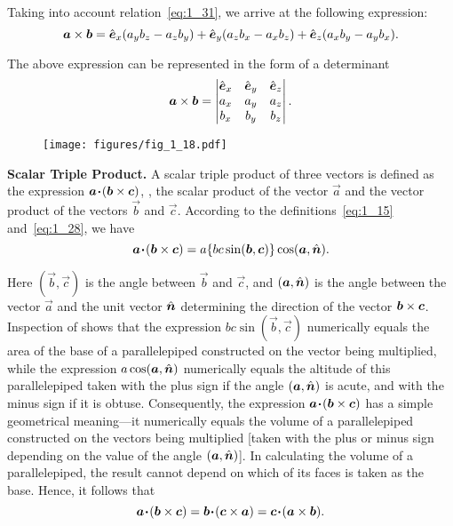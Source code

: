 \noindent
Taking into account relation~\eqref{eq:1_31}, we arrive at the following expression:
\begin{equation}\label{eq:1_32}
\boldsymbol{a}\times\boldsymbol{b} = \hat{\boldsymbol{e}}_{x}(a_yb_z - a_zb_y) + \hat{\boldsymbol{e}}_{y}(a_zb_x - a_xb_z) + \hat{\boldsymbol{e}}_{z}(a_xb_y - a_yb_x).
\end{equation}

\noindent
The above expression can be represented in the form of a determinant
\begin{equation}\label{eq:1_33}
\boldsymbol{a}\times\boldsymbol{b} = \begin{vmatrix}
\hat{\boldsymbol{e}}_{x} & \hat{\boldsymbol{e}}_{y} & \hat{\boldsymbol{e}}_{z}\\
a_x & a_y & a_z\\
b_x & b_y & b_z
\end{vmatrix}.
\end{equation}

\begin{figure}[t]
	\begin{center}
		\texttt{[image: figures/fig\_1\_18.pdf]}
		\caption[]{}
		\label{fig:1_18}
	\end{center}
	\vspace{-0.7cm}
\end{figure}

\textbf{Scalar Triple Product.} A scalar triple product of three vectors is defined as the expression $\boldsymbol{a}\!\boldsymbol{\cdot}\!(\boldsymbol{b}\times\boldsymbol{c})$, \ie, the scalar product of the vector $\vec{a}$ and the vector product of the vectors $\vec{b}$ and $\vec{c}$. According to the definitions~\eqref{eq:1_15} and~\eqref{eq:1_28}, we have
\begin{equation*}
\boldsymbol{a}\!\boldsymbol{\cdot}\!(\boldsymbol{b}\times\boldsymbol{c}) = a\{bc\sin(\boldsymbol{b}, \boldsymbol{c})\}\cos(\boldsymbol{a},\hat{\boldsymbol{n}}).
\end{equation*}

\noindent
Here $(\vec{b},\vec{c})$ is the angle between $\vec{b}$ and $\vec{c}$, and $(\boldsymbol{a},\hat{\boldsymbol{n}})$ is the angle between the vector $\vec{a}$ and the unit vector $\hat{\boldsymbol{n}}$ determining the direction of the vector $\boldsymbol{b}\times\boldsymbol{c}$. Inspection of  shows that the expression $bc\sin(\vec{b},\vec{c})$ numerically equals the area of the base of a parallelepiped constructed on the vector being multiplied, while the expression $a\cos(\boldsymbol{a},\hat{\boldsymbol{n}})$ numerically equals the altitude of this parallelepiped taken with the plus sign if the angle $(\boldsymbol{a},\hat{\boldsymbol{n}})$ is acute, and with the minus sign if it is obtuse. Consequently, the expression $\boldsymbol{a}\!\boldsymbol{\cdot}\!(\boldsymbol{b}\times\boldsymbol{c})$ has a simple geometrical meaning---it numerically equals the volume of a parallelepiped constructed on the vectors being multiplied [taken with the plus or minus sign depending on the value of the angle $(\boldsymbol{a},\hat{\boldsymbol{n}})$]. In calculating the volume of a parallelepiped, the result cannot depend on which of its faces is taken as the base. Hence, it follows that
\begin{equation}\label{eq:1_34}
\boldsymbol{a}\!\boldsymbol{\cdot}\!(\boldsymbol{b}\times\boldsymbol{c}) = \boldsymbol{b}\!\boldsymbol{\cdot}\!(\boldsymbol{c}\times\boldsymbol{a}) = \boldsymbol{c}\!\boldsymbol{\cdot}\!(\boldsymbol{a}\times\boldsymbol{b}).
\end{equation}

